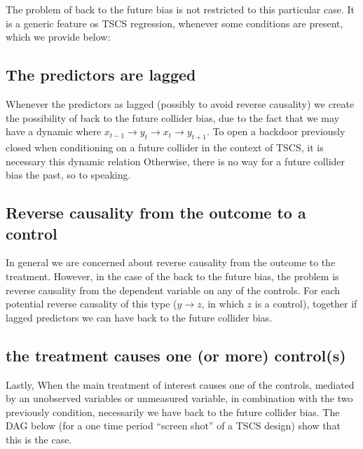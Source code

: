 \documentclass[
  super,
  preprint,
  3p]{elsarticle}
\begin{document}
The problem of back to the future bias is not restricted to this
particular case. It is a generic feature os TSCS regression, whenever
some conditions are present, which we provide below:

\hypertarget{the-predictors-are-lagged}{%
\subsection{The predictors are lagged}\label{the-predictors-are-lagged}}

Whenever the predictors as lagged (possibly to avoid reverse causality)
we create the possibility of back to the future collider bias, due to
the fact that we may have a dynamic where
\(x_{t-1} \rightarrow y_t \rightarrow x_t \rightarrow y_{t+1}\). To open
a backdoor previously closed when conditioning on a future collider in
the context of TSCS, it is necessary this dynamic relation Otherwise,
there is no way for a future collider bias the past, so to speaking.

\hypertarget{reverse-causality-from-the-outcome-to-a-control}{%
\subsection{Reverse causality from the outcome to a
control}\label{reverse-causality-from-the-outcome-to-a-control}}

In general we are concerned about reverse causality from the outcome to
the treatment. However, in the case of the back to the future bias, the
problem is reverse causality from the dependent variable on any of the
controls. For each potential reverse causality of this type
(\(y \rightarrow z\), in which \(z\) is a control), together if lagged
predictors we can have back to the future collider bias.

\hypertarget{the-treatment-causes-one-or-more-controls}{%
\subsection{the treatment causes one (or more)
control(s)}\label{the-treatment-causes-one-or-more-controls}}

Lastly, When the main treatment of interest causes one of the controls,
mediated by an unobserved variables or unmeasured variable, in
combination with the two previously condition, necessarily we have back
to the future collider bias. The DAG below (for a one time period
``screen shot'' of a TSCS design) show that this is the case.
\end{document}
